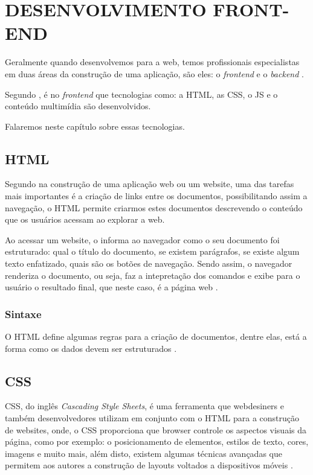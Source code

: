 \chapter{DESENVOLVIMENTO FRONT-END}
\label{desenvolvimentoFrontEnd}

Geralmente quando desenvolvemos para a web, temos profissionais especialistas em
duas áreas da construção de uma aplicação, são eles: o \textit{frontend} e o
\textit{backend} \cite{artigoAvaliacaoEReducaoDoTempoDeRespostaDeSistemasWeb}.

Segundo , é no
\textit{frontend} que tecnologias como: a \ac{HTML}, as \ac{CSS}, o \ac{JS}
e o conteúdo multimídia são desenvolvidos.

Falaremos neste capítulo sobre essas tecnologias.

\section{HTML}

Segundo  na construção de uma aplicação web ou
um website, uma das tarefas mais importantes é a criação de links entre os
documentos, possibilitando assim a navegação, o \acs{HTML} permite criarmos
estes documentos descrevendo o conteúdo que os usuários acessam ao explorar a web.

Ao acessar um website, o  informa ao navegador como o seu documento
foi estruturado: qual o título do documento, se existem parágrafos, se existe
algum texto enfatizado, quais são os botões de navegação. Sendo assim, o
navegador renderiza o documento, ou seja, faz a intepretação dos
comandos e exibe para o usuário o resultado final, que neste caso, é a página
web \cite{headFirstHTMLWithCSSAndXHTML}.

\subsection{Sintaxe}

O HTML define algumas regras para a criação de documentos, dentre elas, está a
forma como os dados devem ser estruturados \cite{htmlCSSTheGoodParts}.

\section{CSS}

\ac{CSS}, do inglês \textit{Cascading Style Sheets}, é uma ferramenta
que webdesiners e também desenvolvedores utilizam em conjunto com o \ac{HTML}
para a construção de websites, onde, o \acs{CSS} proporciona que \ac{browser}
controle os aspectos visuais da página, como por exemplo: o posicionamento de elementos,
estilos de texto, cores, imagens e muito mais, além disto, existem algumas
técnicas avançadas que permitem aos autores a construção de layouts voltados a
dispositivos móveis \cite{beginningCSSCascadingStyleSheetsForWebDesign}.

